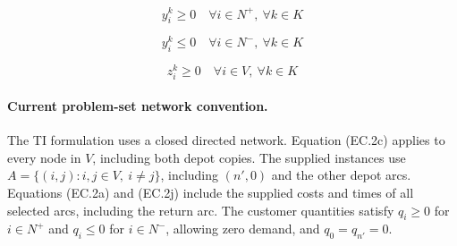 \documentclass{article}
\begin{document}
\begin{equation}
y_i^k \ge 0
\quad \forall i \in N^{+},\ \forall k \in K
\tag{EC.2n}
\end{equation}

\begin{equation}
y_i^k \le 0
\quad \forall i \in N^{-},\ \forall k \in K
\tag{EC.2o}
\end{equation}

\begin{equation}
z_i^k \ge 0
\quad \forall i \in V,\ \forall k \in K
\tag{EC.2p}
\end{equation}

\paragraph{Current problem-set network convention.}
The TI formulation uses a closed directed network. Equation (EC.2c) applies to every node in $V$, including both depot copies. The supplied instances use $A=\{(i,j):i,j\in V,\ i\ne j\}$, including $(n',0)$ and the other depot arcs. Equations (EC.2a) and (EC.2j) include the supplied costs and times of all selected arcs, including the return arc. The customer quantities satisfy $q_i\ge0$ for $i\in N^+$ and $q_i\le0$ for $i\in N^-$, allowing zero demand, and $q_0=q_{n'}=0$.
\end{document}
